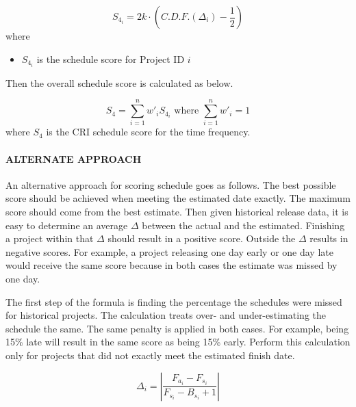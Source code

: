 \documentclass[SDSUThesis.tex]{subfiles}
\begin{document}
                \begin{equation}
                \label{eq:CDF}
                    S_{4_i} = 2k \cdot (C.D.F.(\Delta_i) - \frac{1}{2})
                \end{equation}
                where
                \begin{itemize}
                    \item $S_{4_i}$ is the schedule score for Project ID $i$
                \end{itemize}
                
                Then the overall schedule score is calculated as below.
                
                \[
                    S_{4} = \sum\limits^n_{i=1} w'_i S_{4_i} \text{ where } \sum\limits^n_{i=1} w'_i = 1
                \]
                where $S_4$ is the CRI schedule score for the time frequency.
    
            \paragraph{ALTERNATE APPROACH}
                An alternative approach for scoring schedule goes as follows.
                The best possible score should be achieved
                when meeting the estimated date exactly.  The maximum score
                should come from the best estimate.  Then given historical
                release data, it is easy to determine an 
                average $\Delta$ between the actual and the estimated.  
                Finishing a project within that $\Delta$ should result 
                in a positive score.  Outside the $\Delta$ results in
                negative scores.  For example, a project releasing
                one day early or one day late would receive the same score
                because in both cases the estimate was missed by one day.
                
                The first step of the formula is finding the percentage the schedules were missed for 
                historical projects.  The calculation treats over- and under-estimating the schedule
                the same.  The same penalty is applied in both cases.  For example, being 15\% late
                will result in the same score as being 15\% early. Perform this calculation
                only for projects that did not exactly meet the estimated finish date.
                
                \begin{displaymath}
                    \Delta_i = \left| \frac{F_{a_i} - F_{s_i}}{ F_{s_i} - B_{s_i} + 1} \right|
                \end{displaymath}
                
\end{document}
